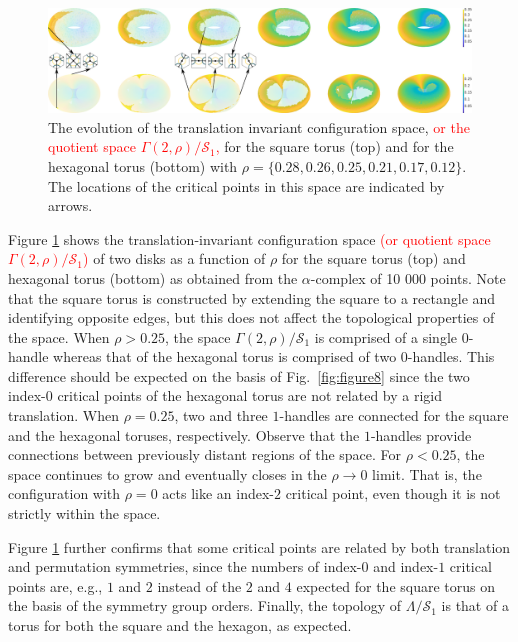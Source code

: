 \documentclass[default,iicol]{sn-jnl}%
\theoremstyle{thmstyleone}%
\theoremstyle{thmstyletwo}%
\theoremstyle{thmstylethree}%
\providecommand{\red}[1]{\textcolor{red}{#1}}
\begin{document}
\begin{figure}
	\centering
	\includegraphics[width=1.0\textwidth]{figure9.eps}
	\caption{The evolution of the translation invariant configuration space, \red{or the quotient space $\Gamma(2, \rho) / \mathcal{S}_1$,} for the square torus (top) and for the hexagonal torus (bottom) with $\rho=\{0.28, 0.26, 0.25, 0.21, 0.17, 0.12\}$. The locations of the critical points in this space are indicated by arrows.}
	\label{fig:figure9}
\end{figure}

Figure \ref{fig:figure9} shows the translation-invariant configuration space \red{(or quotient space $\Gamma(2, \rho) / \mathcal{S}_1$)} of two disks as a function of $\rho$ for the square torus (top) and hexagonal torus (bottom) as obtained from the $\alpha$-complex of 10 000 points. Note that the square torus is constructed by extending the square to a rectangle and identifying opposite edges, but this does not affect the topological properties of the space. When $\rho > 0.25$, the space $\Gamma(2, \rho) / \mathcal{S}_1$ is comprised of a single $0$-handle whereas that of the hexagonal torus is comprised of two $0$-handles. This difference should be expected on the basis of Fig.\ \ref{fig:figure8} since the two index-$0$ critical points of the hexagonal torus are not related by a rigid translation. When $\rho = 0.25$, two and three $1$-handles are connected for the square and the hexagonal toruses, respectively. Observe that the $1$-handles provide connections between previously distant regions of the space. For $\rho < 0.25$, the space continues to grow and eventually closes in the $\rho \rightarrow 0$ limit. That is, the configuration with $\rho = 0$ acts like an index-$2$ critical point, even though it is not strictly within the space.

Figure \ref{fig:figure9} further confirms that some critical points are related by both translation and permutation symmetries, since the numbers of index-$0$ and index-$1$ critical points are, e.g., $1$ and $2$ instead of the $2$ and $4$ expected for the square torus on the basis of the symmetry group orders. Finally, the topology of $\Lambda / \mathcal{S}_1$ is that of a torus for both the square and the hexagon, as expected.
\end{document}
